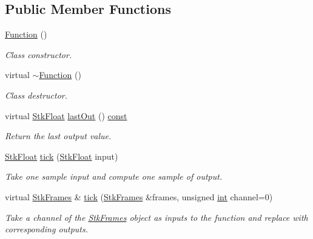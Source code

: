 \subsection*{Public Member Functions}
\begin{DoxyCompactItemize}
\item 
\hyperlink{class_nyq_1_1_function_ae206568fd4fd4c885e3ccff76345c4e6}{Function} ()
\begin{DoxyCompactList}\small\item\em Class constructor. \end{DoxyCompactList}\item 
virtual \hyperlink{class_nyq_1_1_function_a3b03f7cf0b75d16edebdda1dee1db6fd}{$\sim$\+Function} ()
\begin{DoxyCompactList}\small\item\em Class destructor. \end{DoxyCompactList}\item 
virtual \hyperlink{namespace_nyq_a044fa20a706520a617bbbf458a7db7e4}{Stk\+Float} \hyperlink{class_nyq_1_1_function_a28c75915320fed02f91f7821d976e1e9}{last\+Out} () \hyperlink{getopt1_8c_a2c212835823e3c54a8ab6d95c652660e}{const} 
\begin{DoxyCompactList}\small\item\em Return the last output value. \end{DoxyCompactList}\item 
\hyperlink{namespace_nyq_a044fa20a706520a617bbbf458a7db7e4}{Stk\+Float} \hyperlink{class_nyq_1_1_function_aff1860fc333f2f8c032689149588202f}{tick} (\hyperlink{namespace_nyq_a044fa20a706520a617bbbf458a7db7e4}{Stk\+Float} input)
\begin{DoxyCompactList}\small\item\em Take one sample input and compute one sample of output. \end{DoxyCompactList}\item 
virtual \hyperlink{class_nyq_1_1_stk_frames}{Stk\+Frames} \& \hyperlink{class_nyq_1_1_function_a5d1c0cd1c3cdb477897d83137fe4472b}{tick} (\hyperlink{class_nyq_1_1_stk_frames}{Stk\+Frames} \&frames, unsigned \hyperlink{xmltok_8h_a5a0d4a5641ce434f1d23533f2b2e6653}{int} channel=0)
\begin{DoxyCompactList}\small\item\em Take a channel of the \hyperlink{class_nyq_1_1_stk_frames}{Stk\+Frames} object as inputs to the function and replace with corresponding outputs. \end{DoxyCompactList}\end{DoxyCompactItemize}
